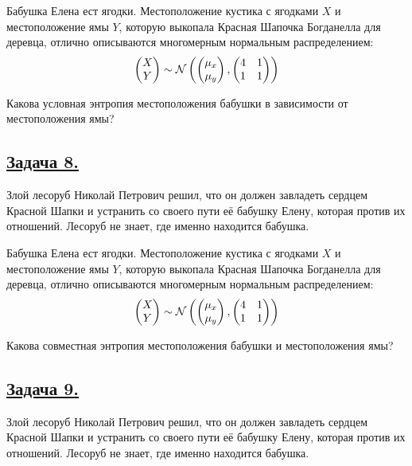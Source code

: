 Бабушка Елена ест ягодки. Местоположение кустика с ягодками $X$ и местоположение ямы $Y$, которую выкопала Красная Шапочка Богданелла для деревца, отлично описываются многомерным нормальным распределением:
\[\begin{pmatrix} 
    X \\ 
    Y 
  \end{pmatrix}\sim \mathcal{N}\left(\begin{pmatrix} 
      \mu _x \\ 
      \mu _y 
    \end{pmatrix},
    \begin{pmatrix} 
      4 & 1 \\ 
      1 & 1
    \end{pmatrix}\right)\]

Какова условная энтропия местоположения бабушки в зависимости от местоположения ямы?

\subsection*{\hyperref[sec:sol_problem8]{Задача 8.}}\label{sec:problem8} Злой лесоруб Николай Петрович решил, что он должен завладеть сердцем Красной Шапки и устранить со своего пути её бабушку Елену, которая против их отношений. Лесоруб не знает, где именно находится бабушка.

Бабушка Елена ест ягодки. Местоположение кустика с ягодками $X$ и местоположение ямы $Y$, которую выкопала Красная Шапочка Богданелла для деревца, отлично описываются многомерным нормальным распределением:
\[\begin{pmatrix} 
    X \\ 
    Y 
  \end{pmatrix}\sim \mathcal{N}\left(\begin{pmatrix} 
      \mu _x \\ 
      \mu _y 
    \end{pmatrix},
    \begin{pmatrix} 
      4 & 1 \\ 
      1 & 1
    \end{pmatrix}\right)\]

Какова совместная энтропия местоположения бабушки и местоположения ямы?

\subsection*{\hyperref[sec:sol_problem9]{Задача 9.}}\label{sec:problem9} Злой лесоруб Николай Петрович решил, что он должен завладеть сердцем Красной Шапки и устранить со своего пути её бабушку Елену, которая против их отношений. Лесоруб не знает, где именно находится бабушка.

